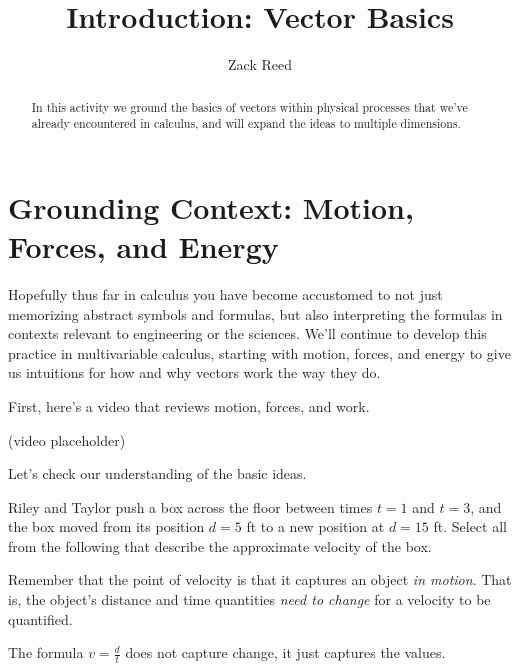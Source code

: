\documentclass{ximera}
\title{Introduction: Vector Basics}
\author{Zack Reed}
\begin{document}
\begin{abstract}
In this activity we ground the basics of vectors within physical processes that we've already encountered in calculus, and will expand the ideas to multiple dimensions.
\end{abstract}
\maketitle

\section*{Grounding Context: Motion, Forces, and Energy}
Hopefully thus far in calculus you have become accustomed to not just memorizing abstract symbols and formulas, but also interpreting the formulas in contexts relevant to engineering or the sciences. We'll continue to develop this practice in multivariable calculus, starting with motion, forces, and energy to give us intuitions for how and why vectors work the way they do.

First, here's a video that reviews motion, forces, and work.

(video placeholder)

Let's check our understanding of the basic ideas.

\begin{problem}
Riley and Taylor push a box across the floor between times $t=1$ and $t=3$, and the box moved from its position $d=5$ ft to a new position at $d=15$ ft. Select all from the following that describe the approximate velocity of the box.
\begin{selectAll}
\end{selectAll}
\begin{feedback}
Remember that the point of velocity is that it captures an object \emph{in motion}. That is, the object's distance and time quantities \emph{need to change} for a velocity to be quantified. 

The formula $v=\frac{d}{t}$ does not capture change, it just captures the values.
\end{feedback}
\end{problem}
\end{document}
